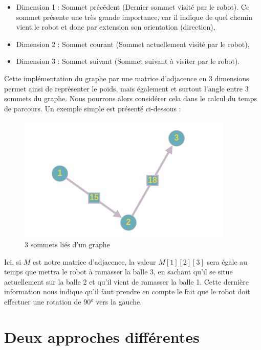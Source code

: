 \documentclass[12pt]{article}
\begin{document}
    \begin{itemize}
        \item Dimension 1 : Sommet précédent (Dernier sommet visité par le robot). Ce sommet présente une très grande importance, car il indique de quel chemin vient le robot et donc par extension son orientation (direction),
        \item Dimension 2 : Sommet courant (Sommet actuellement visité par le robot),
        \item Dimension 3 : Sommet suivant (Sommet suivant à visiter par le robot).
    \end{itemize}

    Cette implémentation du graphe par une matrice d'adjacence en 3 dimensions permet ainsi de représenter le poids, mais également et surtout l'angle entre 3 sommets du graphe. Nous pourrons alors considérer cela dans le calcul du temps de parcours. Un exemple simple est présenté ci-dessous :

    \begin{figure}[H]
        \centering
        \includegraphics[scale=0.7]{img/example_3dim}
        \caption{3 sommets liés d'un graphe}
        \label{img_3somlinked}
    \end{figure}

    Ici, si $M$ est notre matrice d'adjacence, la valeur $M[1][2][3]$ sera égale au temps que mettra le robot à ramasser la balle 3, en sachant qu'il se situe actuellement sur la balle 2 et qu'il vient de ramasser la balle 1. Cette dernière information nous indique qu'il faut prendre en compte le fait que le robot doit effectuer une rotation de $90$° vers la gauche.

    \section{Deux approches différentes}
    \label{sec:diff_approch}
    
\end{document}
